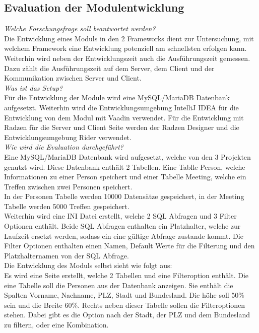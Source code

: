 \documentclass[ngerman]{article}
\begin{document}
    \subsection{Evaluation der Modulentwicklung}
    \textit{Welche Forschungsfrage soll beantwortet werden?}\\
    Die Entwicklung eines Moduls in den 2 Frameworks dient zur Untersuchung, mit welchem Framework eine Entwicklung potenziell am schnellsten erfolgen kann. Weiterhin wird neben der Entwicklungszeit auch die Ausführungszeit gemessen. Dazu zählt die Ausführungszeit auf dem Server, dem Client und der Kommunikation zwischen Server und Client.\\
    \textit{Was ist das Setup?}\\
    Für die Entwicklung der Module wird eine MySQL/MariaDB Datenbank aufgesetzt. Weiterhin wird die Entwicklungsumgebung IntelliJ IDEA für die Entwicklung von dem Modul mit Vaadin verwendet. Für die Entwicklung mit Radzen für die Server und Client Seite werden der Radzen Designer und die Entwicklungsumgebung Rider verwendet.\\
    \textit{Wie wird die Evaluation durchgeführt?}\\
    Eine MySQL/MariaDB Datenbank wird aufgesetzt, welche von den 3 Projekten genutzt wird. Diese Datenbank enthält 2 Tabellen. Eine Tablle Person, welche Informationen zu einer Person speichert und einer Tabelle Meeting, welche ein Treffen zwischen zwei Personen speichert.\\
    In der Personen Tabelle werden 10000 Datensätze gespeichert, in der Meeting Tabelle werden 5000 Treffen gespeichert.\\
    Weiterhin wird eine INI Datei erstellt, welche 2 SQL Abfragen und 3 Filter Optionen enthält. Beide SQL Abfragen enthalten ein Platzhalter, welche zur Laufzeit ersetzt werden, sodass ein eine gültige Abfrage zustande kommt. Die Filter Optionen enthalten einen Namen, Default Werte für die Filterung und den Platzhalternamen von der SQL Abfrage.\\
    Die Entwicklung des Moduls selbst sieht wie folgt aus:\\
    Es wird eine Seite erstellt, welche 2 Tabellen und eine Filteroption enthält. Die eine Tabelle soll die Personen aus der Datenbank anzeigen. Sie enthält die Spalten Vorname, Nachname, PLZ, Stadt und Bundesland. Die höhe soll 50\% sein und die Breite 60\%. Rechts neben dieser Tabelle sollen die Filteroptionen stehen. Dabei gibt es die Option nach der Stadt, der PLZ und dem Bundesland zu filtern, oder eine Kombination.\\
\end{document}
